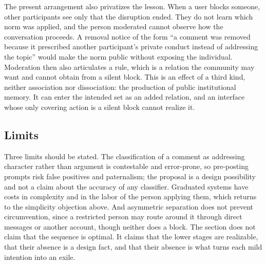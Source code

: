 The present arrangement also privatizes the lesson. When a user blocks someone, other participants see only that the disruption ended. They do not learn which norm was applied, and the person moderated cannot observe how the conversation proceeds. A removal notice of the form ``a comment was removed because it prescribed another participant's private conduct instead of addressing the topic'' would make the norm public without exposing the individual. Moderation then also articulates a rule, which is a relation the community may want and cannot obtain from a silent block. This is an effect of a third kind, neither association nor dissociation: the production of public institutional memory. It can enter the intended set as an added relation, and an interface whose only covering action is a silent block cannot realize it.

\subsection{Limits}

Three limits should be stated. The classification of a comment as addressing character rather than argument is contestable and error-prone, so pre-posting prompts risk false positives and paternalism; the proposal is a design possibility and not a claim about the accuracy of any classifier. Graduated systems have costs in complexity and in the labor of the person applying them, which returns to the simplicity objection above. And asymmetric separation does not prevent circumvention, since a restricted person may route around it through direct messages or another account, though neither does a block. The section does not claim that the sequence is optimal. It claims that the lower stages are realizable, that their absence is a design fact, and that their absence is what turns each mild intention into an exile.
